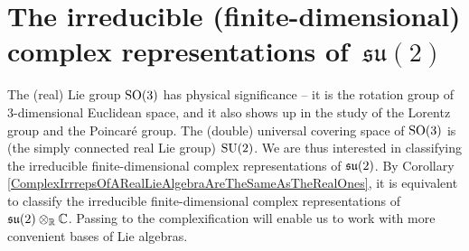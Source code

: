 

\section{The irreducible (finite-dimensional) complex representations of \,$\mathfrak{su}(2)$}
\setcounter{theorem}{0}
\setcounter{equation}{0}


\renewcommand{\theenumi}{\roman{enumi}}
\renewcommand{\labelenumi}{\textnormal{(\theenumi)}$\;\;$}


\vskip 0.3cm
\begin{remark}
\mbox{}
\vskip 0.1cm
\noindent
The (real) Lie group $\textnormal{SO}(3)$ has physical significance --
it is the rotation group of $3$-dimensional Euclidean space, and
it also shows up in the study of the Lorentz group and the Poincaré group.
The (double) universal covering space of $\textnormal{SO}(3)$ is (the simply connected real Lie group) $\textnormal{SU}(2)$.
We are thus interested in classifying the irreducible finite-dimensional complex representations of $\mathfrak{su}(2)$.
By Corollary \ref{ComplexIrrrepsOfARealLieAlgebraAreTheSameAsTheRealOnes},
it is equivalent to classify the irreducible finite-dimensional complex representations of $\mathfrak{su}(2) \otimes_{\mathbb{R}} \mathbb{C}$.
Passing to the complexification will enable us to work with more convenient bases of Lie algebras.
\end{remark}


